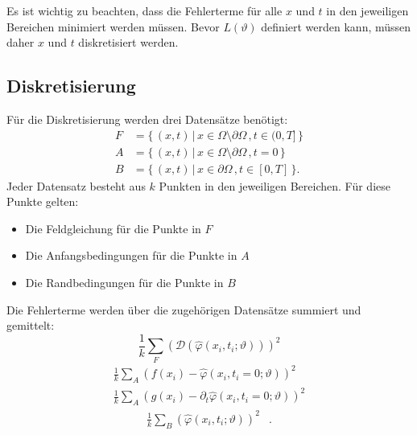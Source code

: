 Es ist wichtig zu beachten, dass die Fehlerterme für alle $x$ und $t$ in den jeweiligen Bereichen minimiert werden müssen.
Bevor $L(\vartheta)$ definiert werden kann, müssen daher $x$ und $t$ diskretisiert werden.

\subsection{Diskretisierung}\label{neuronal:subsection:diskretierung}
Für die Diskretisierung werden drei Datensätze benötigt:
\begin{equation}
    \begin{aligned}
        F &= \{\, (x, t) \,|\, x \in \Omega \setminus \partial \Omega\,, t \in (0,T] \,\}\\
        A &= \{\, (x, t) \,|\, x \in \Omega \setminus \partial \Omega\,, t = 0 \,\}\\
        B &= \{\, (x, t) \,|\, x \in \partial \Omega\,, t \in [0, T] \,\}.
    \end{aligned}
\end{equation}
Jeder Datensatz besteht aus $k$ Punkten in den jeweiligen Bereichen.
Für diese Punkte gelten:
\begin{itemize}
    \item Die Feldgleichung für die Punkte in $F$
    \item Die Anfangsbedingungen für die Punkte in $A$
    \item Die Randbedingungen für die Punkte in $B$
\end{itemize}
Die Fehlerterme werden über die zugehörigen Datensätze summiert und gemittelt:
\begin{equation}
    \frac{1}{k} \sum_{F}^{} \left(\mathcal{D}(\hat{\varphi}(x_i, t_i; \vartheta))\right)^2
    \label{neuronal:feldgleichung_umformuliert_netz_disk}
\end{equation}
\begin{equation}
    \begin{aligned}
        \frac{1}{k} \sum_{A}^{} \left(f(x_i) - \hat{\varphi}(x_i, t_i = 0; \vartheta)\right)^2\\
        \frac{1}{k} \sum_{A}^{} \left(g(x_i) - \partial_t \hat{\varphi}(x_i, t_i = 0; \vartheta)\right)^2
    \end{aligned}
    \label{neuronal:anfangsbedingung_umformuliert_netz_disk}
\end{equation}
\begin{equation}
    \begin{aligned}
        \frac{1}{k} \sum_{B}^{} \left(\hat{\varphi}(x_i, t_i; \vartheta)\right)^2 &.
    \end{aligned}
    \label{neuronal:randbedingung_umformuliert_netz_disk}
\end{equation}
